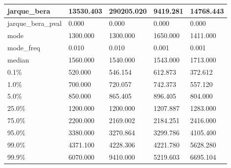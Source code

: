 \begin{table}[H]
\begin{tabular}{|l|m{10em}|m{10em}|m{10em}|m{10em}|}
\hline jarque\_bera & 13530.403 & 290205.020 & 9419.281 & 14768.443 \\
\hline jarque\_bera\_pval & 0.000 & 0.000 & 0.000 & 0.000 \\
\hline mode & 1300.000 & 1300.000 & 1650.000 & 1411.000 \\
\hline mode\_freq & 0.010 & 0.010 & 0.001 & 0.001 \\
\hline median & 1560.000 & 1540.000 & 1543.000 & 1713.000 \\
\hline 0.1\% & 520.000 & 546.154 & 612.873 & 372.612 \\
\hline 1.0\% & 700.000 & 720.057 & 742.373 & 557.120 \\
\hline 5.0\% & 850.000 & 865.405 & 896.405 & 804.000 \\
\hline 25.0\% & 1200.000 & 1200.000 & 1207.887 & 1283.000 \\
\hline 75.0\% & 2200.000 & 2169.002 & 2184.251 & 2416.000 \\
\hline 95.0\% & 3380.000 & 3270.864 & 3299.786 & 4105.400 \\
\hline 99.0\% & 4371.100 & 4228.306 & 4221.780 & 5628.280 \\
\hline 99.9\% & 6070.000 & 9410.000 & 5219.603 & 6695.104 \\
\hline
\end{tabular}
\end{table}
